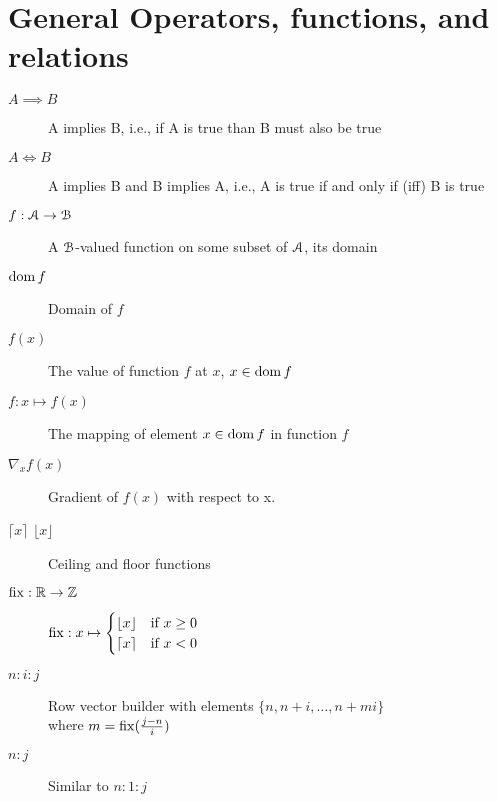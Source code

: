 \documentclass[../main.tex]{subfiles}
\begin{document}
\section*{General Operators, functions, and relations}
\begin{description}
  \item[$A\implies B$] A implies B, i.e., if A is true than B must also be true
  \item[$A\iff B$] A implies B and B implies A, i.e., A is true if and only if (iff) B is true
\item[$f:\mathcal{A}\to\mathcal{B}$] A $\mathcal{B}$-valued function on some subset of $\mathcal{A}$, its domain
\item[$\operatorname{dom} f$] Domain of $f$
\item[$f(x)$] The value of function $f$ at $x$, $x\in\operatorname{dom} f$
\item[$f:x\mapsto f(x)$] The mapping of element $x\in\operatorname{dom} f$ in function $f$
\item[$\nabla_{x}f(x)$] Gradient of $f(x)$ with respect to x.
\item[$\lceil x\rceil$ $\lfloor x\rfloor$] Ceiling and floor functions
  \item[$\operatorname{fix}:\mathbb{R}\to\mathbb{Z}$] $\operatorname{fix}:x\mapsto
        \begin{cases}
          \lfloor x\rfloor&\text{if $x\geq0$}\\
          \lceil x\rceil&\text{if $x<0$}\\
        \end{cases}
        $
  \item[$n:i:j$] Row vector builder with elements ${\{n,n+i,\dots,n+mi\}}$
        \\where $m=\operatorname{fix}(\frac{j-n}{i})$
  \item[$n\mathbin{:}j$] Similar to ${n\mathbin{:}1\mathbin{:}j}$
\end{description}
\end{document}
